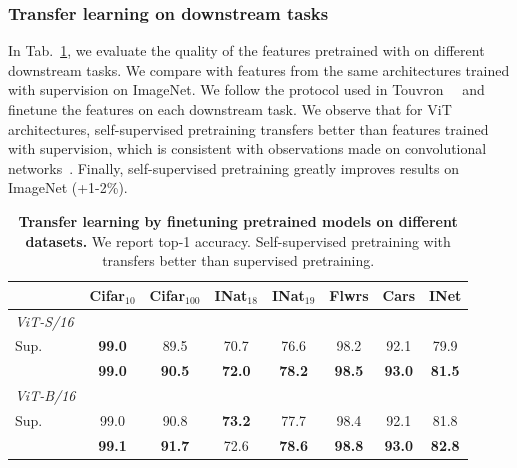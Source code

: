 \subsubsection{Transfer learning on downstream tasks}
In Tab.~\ref{tab:transfers}, we evaluate the quality of the features pretrained with \OURS on different downstream tasks.
We compare with features from the same architectures trained with supervision on ImageNet.
We follow the protocol used in Touvron~\etal~\cite{touvron2020training} and finetune the features on each downstream task.
We observe that for ViT architectures, self-supervised pretraining transfers better than features trained with supervision, which is consistent with observations made on convolutional networks~\cite{caron2020unsupervised,he2020momentum,sariyildiz2020concept}.
Finally, self-supervised pretraining greatly improves results on ImageNet (+1-2\%). 

\begin{table}[t]
  \centering
	\caption{\textbf{Transfer learning by finetuning pretrained models on different datasets.}
We report top-1 accuracy.
Self-supervised pretraining with \OURS transfers better than supervised pretraining.}
\small
  \setlength{\tabcolsep}{3pt}
  \begin{tabular}{@{}l ccccccc@{}}
    \toprule
	   & Cifar$_{\text{10}}$ & Cifar$_{\text{100}}$ & INat$_{\text{18}}$ & INat$_{\text{19}}$ & Flwrs & Cars & INet \\
    \midrule
\textit{\small ViT-S/16}\\
	  Sup.~\cite{touvron2020training}           & \bf 99.0 & 89.5 & 70.7     & 76.6     & 98.2     & 92.1 & 79.9 \\
\rowcolor{Light}
	  \OURS 			            & \bf 99.0 & \bf 90.5 & \bf 72.0 & \bf 78.2 & \bf 98.5 & \bf 93.0 & \bf 81.5 \\
    \midrule
\textit{\small ViT-B/16}\\
	  Sup.~\cite{touvron2020training}           & 99.0 & 90.8 & \bf 73.2 & 77.7 & 98.4 & 92.1 & 81.8 \\
\rowcolor{Light}
	  \OURS                                     & \bf 99.1 & \bf 91.7 &  72.6 & \bf 78.6 & \bf 98.8 & \bf 93.0 & \bf 82.8 \\
    \bottomrule
  \end{tabular}
  \label{tab:transfers}
\end{table}


